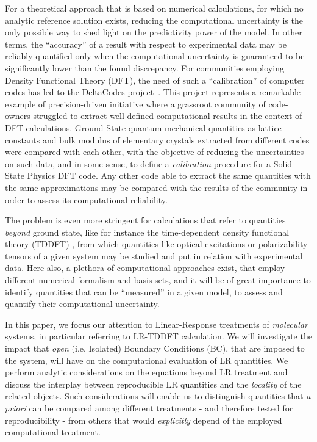 \documentclass[reprint,aps,prb]{revtex4-1}
\begin{document}
For a theoretical approach that is based on numerical calculations, for which no analytic reference solution exists,
reducing the computational uncertainty is the only possible way to shed light on the predictivity power of the
model. In other terms, the ``accuracy'' of a result with respect to experimental data may be reliably quantified
only when the computational uncertainty is guaranteed to be significantly lower than the found discrepancy.
For communities employing Density Functional Theory (DFT), the need of such a ``calibration'' of computer codes has led to the DeltaCodes project~\cite{deltaTest2016}.
This project represents a remarkable example of precision-driven initiative where a grassroot community of code-owners struggled to extract
well-defined computational results in the context of DFT calculations. Ground-State quantum mechanical quantities
as lattice constants and bulk modulus of elementary crystals extracted from different codes were compared with each other, with the objective of reducing the uncertainties on such data, and in some sense, to define a \emph{calibration} procedure for a Solid-State Physics DFT code.
Any other code able to extract the same quantities with the same approximations may be compared with the
results of the community in order to assess its computational reliability.

The problem is even more stringent for calculations that refer to quantities \emph{beyond} ground state, like
for instance the time-dependent density functional theory (TDDFT) \cite{casida1995,runge1984,onida2002},
from which quantities like optical excitations or polarizability tensors
of a given system may be studied and put in relation with experimental data.
Here also, a plethora of computational approaches exist, that employ different numerical formalism and
basis sets, and it will be of great importance to identify quantities that can be ``measured'' in a given model, to assess
and quantify their computational uncertainty.

In this paper, we focus our attention to Linear-Response treatments of \emph{molecular} systems,
in particular referring to LR-TDDFT calculation. We will investigate the impact that \emph{open} (i.e. Isolated) Boundary Conditions (BC), that are imposed to the system, will have on the computational evaluation of LR quantities.
We perform analytic considerations on the equations beyond LR treatment and discuss the interplay between reproducible LR quantities and the \emph{locality} of the related objects. Such considerations will enable us to distinguish quantities that \textit{a priori} can be compared among different treatments - and therefore tested for reproducibility - from others that would \emph{explicitly} depend of the employed computational treatment.
\end{document}
